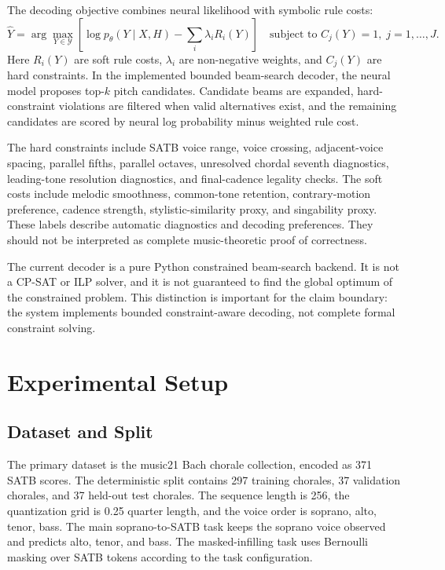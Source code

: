 \documentclass[11pt]{article}
\begin{document}
The decoding objective combines neural likelihood with symbolic rule costs:
\[
\hat{Y} =
\arg\max_{Y \in \mathcal{Y}}
\left[
\log p_\theta(Y\mid X,H) - \sum_i \lambda_i R_i(Y)
\right]
\quad \text{subject to } C_j(Y)=1,\; j=1,\ldots,J .
\]
Here $R_i(Y)$ are soft rule costs, $\lambda_i$ are non-negative weights, and $C_j(Y)$ are hard constraints. In the implemented bounded beam-search decoder, the neural model proposes top-$k$ pitch candidates. Candidate beams are expanded, hard-constraint violations are filtered when valid alternatives exist, and the remaining candidates are scored by neural log probability minus weighted rule cost.

The hard constraints include SATB voice range, voice crossing, adjacent-voice spacing, parallel fifths, parallel octaves, unresolved chordal seventh diagnostics, leading-tone resolution diagnostics, and final-cadence legality checks. The soft costs include melodic smoothness, common-tone retention, contrary-motion preference, cadence strength, stylistic-similarity proxy, and singability proxy. These labels describe automatic diagnostics and decoding preferences. They should not be interpreted as complete music-theoretic proof of correctness.

The current decoder is a pure Python constrained beam-search backend. It is not a CP-SAT or ILP solver, and it is not guaranteed to find the global optimum of the constrained problem. This distinction is important for the claim boundary: the system implements bounded constraint-aware decoding, not complete formal constraint solving.

\section{Experimental Setup}

\subsection{Dataset and Split}

The primary dataset is the music21 Bach chorale collection, encoded as 371 SATB scores. The deterministic split contains 297 training chorales, 37 validation chorales, and 37 held-out test chorales. The sequence length is 256, the quantization grid is 0.25 quarter length, and the voice order is soprano, alto, tenor, bass. The main soprano-to-SATB task keeps the soprano voice observed and predicts alto, tenor, and bass. The masked-infilling task uses Bernoulli masking over SATB tokens according to the task configuration.
\end{document}
